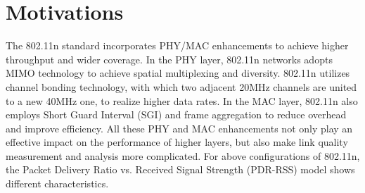 \documentclass[draftclsnofoot,journal,onecolumn,11pt]{IEEEtran}
\begin{document}
%
%
%
%
%
%

\section{Motivations}

The 802.11n standard incorporates PHY/MAC enhancements to achieve higher throughput and wider coverage. In the PHY layer, 802.11n networks adopts MIMO technology to achieve spatial multiplexing and diversity. 802.11n utilizes channel bonding technology, with which two adjacent 20MHz channels are united to a new 40MHz one, to realize higher data rates. In the MAC layer, 802.11n also employs Short Guard Interval (SGI) and frame aggregation to reduce overhead and improve efficiency. All these PHY and MAC enhancements not only play an effective impact on the performance of higher layers, but also make link quality measurement and analysis more complicated. For above configurations of 802.11n, the Packet Delivery Ratio vs. Received Signal Strength (PDR-RSS) model shows different characteristics.
\end{document}
